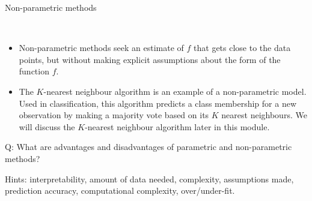 \documentclass[ignorenonframetext,]{beamer}
\begin{document}
\begin{frame}

\begin{block}{Non-parametric methods}

\(~\)

\begin{itemize}
\item
  Non-parametric methods seek an estimate of \(f\) that gets close to
  the data points, but without making explicit assumptions about the
  form of the function \(f\).
\item
  The \(K\)-nearest neighbour algorithm is an example of a
  non-parametric model. Used in classification, this algorithm predicts
  a class membership for a new observation by making a majority vote
  based on its \(K\) nearest neighbours. We will discuss the
  \(K\)-nearest neighbour algorithm later in this module.
\end{itemize}

\end{block}

\end{frame}

\begin{frame}

\begin{block}{Q: What are advantages and disadvantages of parametric and
non-parametric methods?}

Hints: interpretability, amount of data needed, complexity, assumptions
made, prediction accuracy, computational complexity, over/under-fit.

\end{block}

\end{frame}
\end{document}
